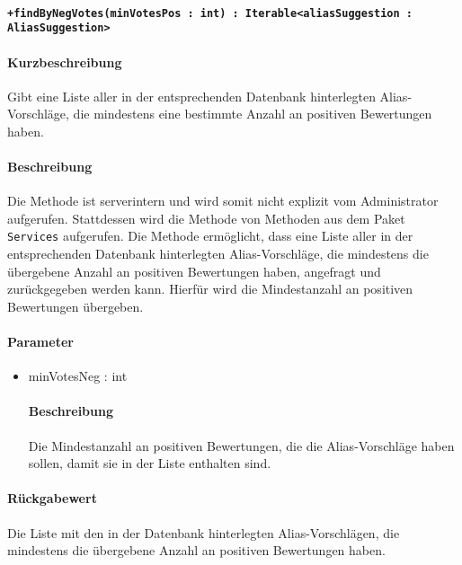 \paragraph*{\texttt{+findByNegVotes(minVotesPos : int) : Iterable<aliasSuggestion : AliasSuggestion>}}%
\paragraph*{Kurzbeschreibung}
Gibt eine Liste aller in der entsprechenden Datenbank hinterlegten Alias-Vorschläge, die mindestens eine bestimmte Anzahl an positiven Bewertungen haben.
\paragraph*{Beschreibung}
Die Methode ist serverintern und wird somit nicht explizit vom Administrator aufgerufen.
Stattdessen wird die Methode von Methoden aus dem Paket \texttt{Services} aufgerufen.
Die Methode ermöglicht, dass eine Liste aller in der entsprechenden Datenbank hinterlegten Alias-Vorschläge, die mindestens die übergebene Anzahl an positiven Bewertungen haben, angefragt und zurückgegeben werden kann.
Hierfür wird die Mindestanzahl an positiven Bewertungen übergeben.
\paragraph*{Parameter}
\begin{itemize}
    \item minVotesNeg : int
    		\paragraph*{Beschreibung}
    		Die Mindestanzahl an positiven Bewertungen, die die Alias-Vorschläge haben sollen, damit sie in der Liste enthalten sind.
\end{itemize}
\paragraph*{Rückgabewert}
Die Liste mit den in der Datenbank hinterlegten Alias-Vorschlägen, die mindestens die übergebene Anzahl an positiven Bewertungen haben.
